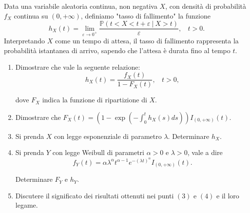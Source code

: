 Data una variabile aleatoria continua, non negativa $X$, con densità di probabilità $f_{X}$ continua su $\left( 0,+\infty \right)$, definiamo "tasso di fallimento" la funzione
\begin{equation*}
h_{X}( t) =\lim _{\varepsilon \rightarrow 0^{+}}\frac{\mathbb{P}( t< X< t+\varepsilon \ |\ X >t)}{\varepsilon } ,\ \ \ \ t >0.
\end{equation*}
Interpretando $X$ come un tempo di attesa, il tasso di fallimento rappresenta la probabilità istantanea di arrivo, sapendo che l'attesa è durata fino al tempo $t$.
\begin{enumerate}
\item Dimostrare che vale la seguente relazione:\begin{equation*}
h_{X}( t) =\frac{f_{X}( t)}{1-F_{X}( t)} ,\ \ \ \ t >0,
\end{equation*}

dove $F_{X}$ indica la funzione di ripartizione di $X$.
\item Dimostrare che $F_{X}( t) =\left( 1-\exp\left( -\int _{0}^{t} h_{X}( s) ds\right)\right) I_{( 0,+\infty )}( t)$.
\item Si prenda $X$ con legge esponenziale di parametro $\lambda $. Determinare $h_{X}$.
\item Si prenda $Y$ con legge Weibull di parametri $\alpha  >0$ e $\lambda  >0$, vale a dire\begin{equation*}
f_{Y}( t) =\alpha \lambda ^{\alpha } t^{\alpha -1} e^{-( \lambda t)^{\alpha }} I_{( 0,+\infty )}( t) .
\end{equation*}

Determinare $F_{Y}$ e $h_{Y}$.
\item Discutere il significato dei risultati ottenuti nei punti $( 3)$ e $( 4)$ e il loro legame.
\end{enumerate}
\subsection{}

